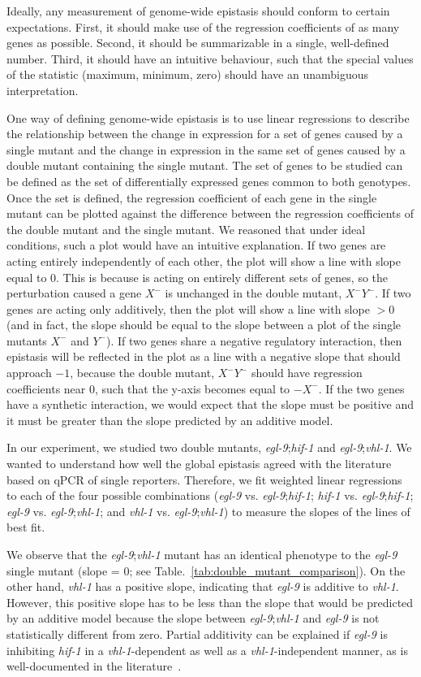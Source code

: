 \documentclass[9pt,twocolumn,twoside]{pnas-new}
\newcommand{\egl}{\emph{egl-9}}
\newcommand{\vhl}{\emph{vhl-1}}
\newcommand{\hif}{\emph{hif-1}}
\begin{document}
Ideally, any measurement of genome-wide epistasis should conform to certain
expectations. First, it should make use of the regression coefficients of as
many genes as possible. Second, it should be summarizable in a single,
well-defined number. Third, it should have an intuitive behaviour, such that
the special values of the statistic (maximum, minimum, zero) should have an
unambiguous interpretation.

One way of defining genome-wide epistasis is to use linear regressions to describe
the relationship between the change in expression for a set of genes caused by a
single mutant and the change in expression in the same set of genes caused by a
double mutant containing the single mutant. The set of genes
to be studied can be defined as the set of differentially expressed genes common
to both genotypes.
Once the set is defined, the regression coefficient of each gene in the single
mutant can be plotted against the difference between the regression coefficients of
the double mutant and the single mutant. We reasoned that under ideal conditions,
such a plot would have an intuitive explanation. If two genes are acting
entirely independently of each other, the plot will show a line with slope equal
to 0. This is because is acting on entirely different sets of genes, so the
perturbation caused a gene $X^-$ is unchanged in the double mutant, $X^-Y^-$. If
two genes are acting only additively, then the plot will show a line with
slope $>0$ (and in fact, the slope should be equal to the slope between a plot of
the single mutants $X^-$ and $Y^-$). If two genes share a negative regulatory interaction,
then epistasis will be reflected in the plot as a line with a negative slope that
should approach $-1$, because
the double mutant, $X^-Y^-$ should have regression coefficients near 0, such that
the y-axis becomes equal to $-X^-$. If the two genes have a synthetic interaction,
we would expect that the slope must be positive and it must be greater than the
slope predicted by an additive model.

In our experiment, we studied two double mutants, \egl{};\hif{} and \egl{};\vhl{}.
We wanted to understand how well the global epistasis agreed with the literature
based on qPCR of single reporters. Therefore, we fit weighted linear regressions
to each of the four possible combinations (\egl{} vs. \egl{};\hif{};
\hif{} vs. \egl{};\hif{}; \egl{} vs. \egl{};\vhl{}; and \vhl{} vs. \egl{};\vhl{})
to measure the slopes of the lines of best fit.

We observe that the \egl{};\vhl{} mutant has an identical phenotype to the
\egl{} single mutant (slope = 0; see Table.~\ref{tab:double_mutant_comparison}).
On the other hand, \vhl{} has a positive slope, indicating that \egl{} is
additive to \vhl{}. However, this positive slope has to be less than the slope that
would be predicted by an additive model because the slope between \egl{};\vhl{} and
\egl{} is not statistically different from zero. Partial additivity can be explained
if \egl{} is inhibiting \hif{} in a \vhl{}-dependent as well as a \vhl{}-independent
manner, as is well-documented in the literature~\cite{Shao2009}.
\end{document}
